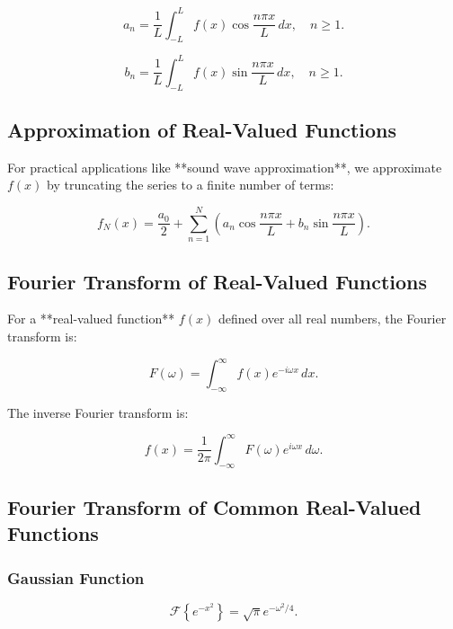 \documentclass[../Main.tex]{subfiles}
\begin{document}
\begin{equation}
a_n = \frac{1}{L} \int_{-L}^{L} f(x) \cos \frac{n\pi x}{L} \, dx, \quad n \geq 1.
\end{equation}

\begin{equation}
b_n = \frac{1}{L} \int_{-L}^{L} f(x) \sin \frac{n\pi x}{L} \, dx, \quad n \geq 1.
\end{equation}

\subsection{Approximation of Real-Valued Functions}

For practical applications like **sound wave approximation**, we approximate \( f(x) \) by truncating the series to a finite number of terms:

\begin{equation}
f_N(x) = \frac{a_0}{2} + \sum_{n=1}^{N} \left( a_n \cos \frac{n\pi x}{L} + b_n \sin \frac{n\pi x}{L} \right).
\end{equation}

\subsection{Fourier Transform of Real-Valued Functions}

For a **real-valued function** \( f(x) \) defined over all real numbers, the Fourier transform is:

\begin{equation}
F(\omega) = \int_{-\infty}^{\infty} f(x) e^{-i\omega x} \, dx.
\end{equation}

The inverse Fourier transform is:

\begin{equation}
f(x) = \frac{1}{2\pi} \int_{-\infty}^{\infty} F(\omega) e^{i\omega x} \, d\omega.
\end{equation}

\subsection{Fourier Transform of Common Real-Valued Functions}

\subsubsection{Gaussian Function}
\begin{equation}
\mathcal{F} \left\{ e^{-x^2} \right\} = \sqrt{\pi} e^{-\omega^2 / 4}.
\end{equation}
\end{document}
